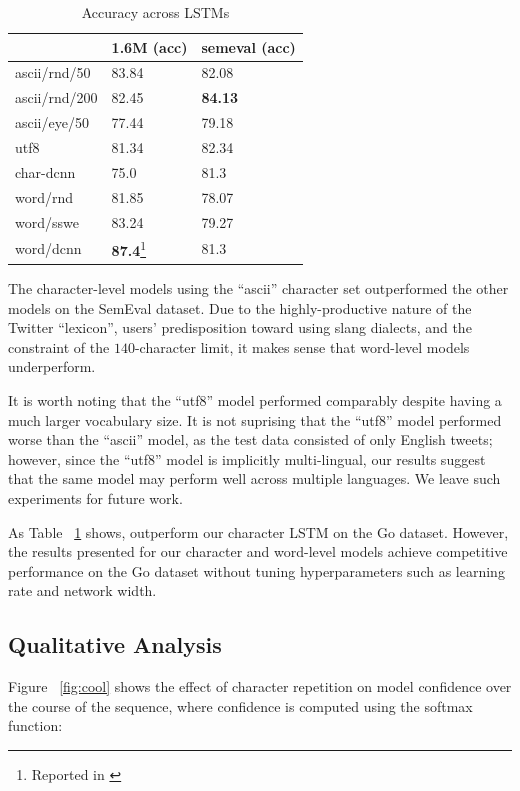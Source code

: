 \documentclass{article} %
\begin{document}
\begin{table}[h!]
\label{table:results}
\centering
\caption{Accuracy across LSTMs}
\begin{tabular}{|l|ll|}
\hline
              & 1.6M (acc)          & semeval (acc) \\
\hline
ascii/rnd/50  & 83.84          & 82.08            \\
ascii/rnd/200 & 82.45          & \textbf{84.13}   \\
ascii/eye/50  & 77.44          & 79.18   \\
utf8          & 81.34          & 82.34   \\
char-dcnn     & 75.0           & 81.3    \\
word/rnd      & 81.85          & 78.07   \\
word/sswe     & 83.24          & 79.27   \\
word/dcnn     & \textbf{87.4}\footnote{Reported in \cite{kalchbrenner2014convolutional}}           & 81.3    \\
\hline
\end{tabular}
\end{table}

The character-level models using the ``ascii'' character set outperformed the other models on the SemEval dataset. Due to the highly-productive nature of the Twitter ``lexicon'', users' predisposition toward using slang dialects, and the constraint of the $140$-character limit, it makes sense that word-level models underperform.

It is worth noting that the ``utf8'' model performed comparably despite having a much larger vocabulary size. It is not suprising that the ``utf8'' model performed worse than the ``ascii'' model, as the test data consisted of only English tweets; however, since the ``utf8'' model is implicitly multi-lingual, our results suggest that the same model may perform well across multiple languages. We leave such experiments for future work.

As Table ~\ref{table:results} shows, \cite{kalchbrenner2014convolutional} outperform our character LSTM on the Go dataset. However, the results presented for our character and word-level models achieve competitive performance on the Go dataset without tuning hyperparameters such as learning rate and network width. 

\subsection{Qualitative Analysis}
Figure ~\ref{fig:cool} shows the effect of character repetition on model confidence over the course of the sequence, where confidence is computed using the softmax function:
\end{document}
